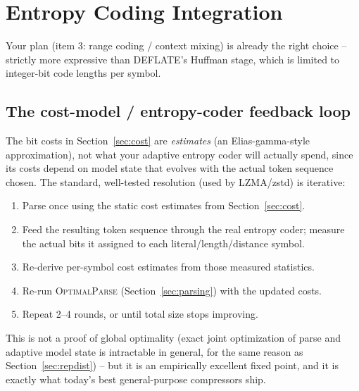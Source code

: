 \documentclass[11pt]{article}
\begin{document}
\section{Entropy Coding Integration}
\label{sec:entropy}

Your plan (item 3: range coding / context mixing) is already the right choice --
strictly more expressive than DEFLATE's Huffman stage, which is limited to integer-bit
code lengths per symbol.

\subsection{The cost-model / entropy-coder feedback loop}

The bit costs in Section~\ref{sec:cost} are \emph{estimates} (an Elias-gamma-style
approximation), not what your adaptive entropy coder will actually spend, since its
costs depend on model state that evolves with the actual token sequence chosen. The
standard, well-tested resolution (used by LZMA/zstd) is iterative:

\begin{enumerate}
  \item Parse once using the static cost estimates from Section~\ref{sec:cost}.
  \item Feed the resulting token sequence through the real entropy coder; measure the
  actual bits it assigned to each literal/length/distance symbol.
  \item Re-derive per-symbol cost estimates from those measured statistics.
  \item Re-run \textsc{OptimalParse} (Section~\ref{sec:parsing}) with the updated costs.
  \item Repeat 2--4 rounds, or until total size stops improving.
\end{enumerate}

This is not a proof of global optimality (exact joint optimization of parse and adaptive
model state is intractable in general, for the same reason as
Section~\ref{sec:repdist}) -- but it is an empirically excellent fixed point, and it is
exactly what today's best general-purpose compressors ship.
\end{document}
